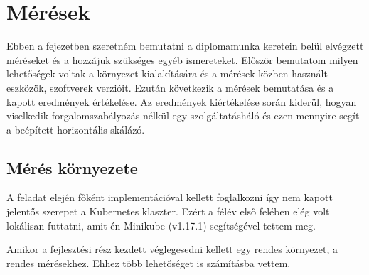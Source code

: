 \chapter{Mérések}
\label{sec:results}
Ebben a fejezetben szeretném bemutatni a diplomamunka keretein belül elvégzett méréseket és a hozzájuk szükséges egyéb ismereteket.
Először bemutatom milyen lehetőségek voltak a környezet kialakítására és a mérések közben használt eszközök, szoftverek verzióit.
Ezután következik a mérések bemutatása és a kapott eredmények értékelése.
Az eredmények kiértékelése során kiderül, hogyan viselkedik forgalomszabályozás nélkül egy szolgáltatásháló és ezen mennyire segít a beépített horizontális skálázó.

\section{Mérés környezete}
A feladat elején főként implementációval kellett foglalkozni így nem kapott jelentős szerepet a Kubernetes klaszter. Ezért  a félév első felében elég volt lokálisan futtatni, amit én Minikube (v1.17.1) segítségével tettem meg. 

Amikor a fejlesztési rész kezdett véglegesedni kellett egy rendes környezet, a rendes mérésekhez. Ehhez több lehetőséget is számításba vettem.	

